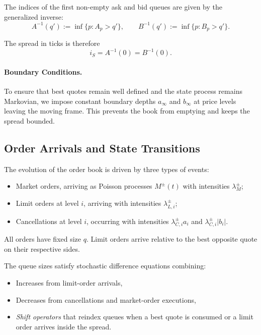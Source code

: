 The indices of the first non-empty ask and bid queues are given by the generalized inverse:
\begin{equation}
A^{-1}(q') := \inf\{p : A_p > q'\},
\qquad
B^{-1}(q') := \inf\{p : B_p > q'\}.
\end{equation}

The spread in ticks is therefore
\begin{equation}
i_S = A^{-1}(0) = B^{-1}(0).
\end{equation}

\paragraph{Boundary Conditions.}
To ensure that best quotes remain well defined and the state process remains Markovian,
we impose constant boundary depths \(a_\infty\) and \(b_\infty\) at price levels leaving the
moving frame. This prevents the book from emptying and keeps the spread bounded.

\subsection{Order Arrivals and State Transitions}

The evolution of the order book is driven by three types of events:
\begin{itemize}
    \item Market orders, arriving as Poisson processes \(M^\pm(t)\) with intensities
    \( \lambda_M^\pm \);
    \item Limit orders at level \(i\), arriving with intensities \( \lambda_{L,i}^\pm \);
    \item Cancellations at level \(i\), occurring with intensities
    \( \lambda_{C,i}^\pm a_i \) and \( \lambda_{C,i}^\pm |b_i| \).
\end{itemize}

All orders have fixed size \(q\).  
Limit orders arrive relative to the best opposite quote on their respective sides.

The queue sizes satisfy stochastic difference equations combining:
\begin{itemize}
    \item Increases from limit-order arrivals,
    \item Decreases from cancellations and market-order executions,
    \item \emph{Shift operators} that reindex queues when a best quote is consumed or
    a limit order arrives inside the spread.
\end{itemize}

